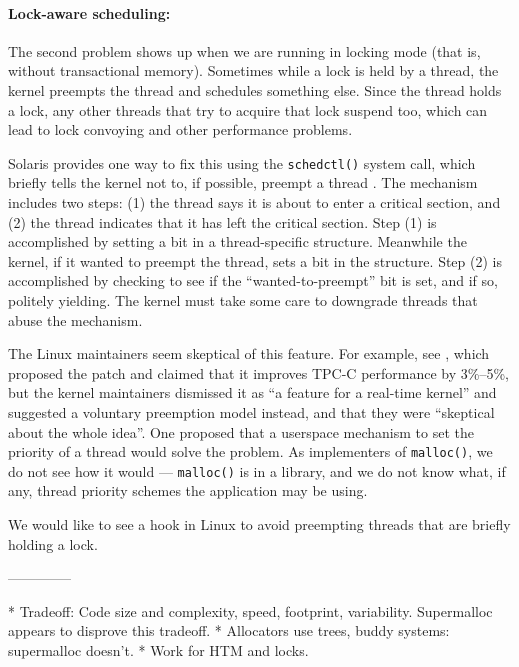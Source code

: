 \documentclass[pldi]{sigplanconf-pldi15}
\newcommand{\code}[1]{\texttt{#1}}
\newcommand{\bcknote}[1]{\cnote{red}{#1}{bck}}
\begin{document}
{\paragraph{Lock-aware scheduling:}} The second problem shows up when
we are running in locking mode (that is, without transactional
memory).  Sometimes while a lock is held by a thread, the kernel
preempts the thread and schedules something else.  Since the thread
holds a lock, any other threads that try to acquire that lock suspend
too, which can lead to lock convoying and other performance problems.

Solaris provides one way to fix this using the \code{schedctl()}
system call, which briefly tells the kernel not to, if possible,
preempt a thread \cite{Dice11}.  The mechanism includes two steps: (1)
the thread says it is about to enter a critical section, and (2) the
thread indicates that it has left the critical section.  Step (1) is
accomplished by setting a bit in a thread-specific structure.
Meanwhile the kernel, if it wanted to preempt the thread, sets a bit
in the structure.  Step (2) is accomplished by checking to see if the
``wanted-to-preempt'' bit is set, and if so, politely yielding.  The
kernel must take some care to downgrade threads that abuse the
mechanism.

The Linux maintainers seem skeptical of this feature.  For example,
see \cite{Aziz14}, which proposed the patch and claimed that it
improves TPC-C performance by 3\%--5\%, but the kernel maintainers
dismissed it as ``a feature for a real-time kernel'' and suggested a
voluntary preemption model instead, and that they were ``skeptical
about the whole idea''.  One proposed \cite{Oboguev14a, Oboguev14b}
that a userspace mechanism to set the priority of a thread would solve
the problem.  As implementers of \code{malloc()}, we do not see how it
would --- \code{malloc()} is in a library, and we do not know what, if
any, thread priority schemes the application may be using.

We would like to see a hook in Linux to avoid preempting threads that
are briefly holding a lock.

\bcknote{HTM-friendly locks}


--------------

* Tradeoff: Code size and complexity, speed, footprint, variability.  Supermalloc appears to disprove this tradeoff.
* Allocators use trees, buddy systems: supermalloc doesn't.
* Work for HTM and locks.
\end{document}
